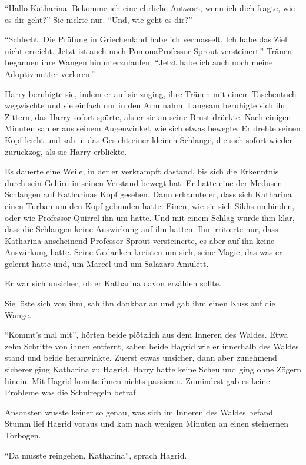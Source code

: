 \enquote{Hallo Katharina. Bekomme ich eine ehrliche Antwort, wenn ich dich fragte, wie es dir geht?} Sie nickte nur. \enquote{Und, wie geht es dir?}

\enquote{Schlecht. Die Prüfung in Griechenland habe ich vermasselt. Ich habe das Ziel nicht erreicht. Jetzt ist auch noch Pomona\abs Professor Sprout versteinert.} Tränen begannen ihre Wangen hinunterzulaufen. \enquote{Jetzt habe ich auch noch meine Adoptivmutter verloren.}

Harry beruhigte sie, indem er auf sie zuging, ihre Tränen mit einem Taschentuch wegwischte und sie einfach nur in den Arm nahm. Langsam beruhigte sich ihr Zittern, das Harry sofort spürte, als er sie an seine Brust drückte. Nach einigen Minuten sah er aus seinem Augenwinkel, wie sich etwas bewegte. Er drehte seinen Kopf leicht und sah in das Gesicht einer kleinen Schlange, die sich sofort wieder zurückzog, als sie Harry erblickte.

Es dauerte eine Weile, in der er verkrampft dastand, bis sich die Erkenntnis durch sein Gehirn in seinen Verstand bewegt hat. Er hatte eine der Medusen-Schlangen auf Katharinas Kopf gesehen. Dann erkannte er, dass sich Katharina einen Turban um den Kopf gebunden hatte. Einen, wie sie sich Sikhs umbinden, oder wie Professor Quirrel ihn um hatte. Und mit einem Schlag wurde ihm klar, dass die Schlangen keine Auswirkung auf ihn hatten. Ihn irritierte nur, dass Katharina anscheinend Professor Sprout versteinerte, es aber auf ihn keine Auswirkung hatte. Seine Gedanken kreisten um sich, seine Magie, das was er gelernt hatte und, um Marcel \gst und um Salazars Amulett.

Er war sich unsicher, ob er Katharina davon erzählen sollte.

Sie löste sich von ihm, sah ihn dankbar an und gab ihm einen Kuss auf die Wange.

\enquote{Kommt’s mal mit}, hörten beide plötzlich aus dem Inneren des Waldes. Etwa zehn Schritte von ihnen entfernt, sahen beide Hagrid wie er innerhalb des Waldes stand und beide heranwinkte. Zuerst etwas unsicher, dann aber zunehmend sicherer ging Katharina zu Hagrid. Harry hatte keine Scheu und ging ohne Zögern hinein. Mit Hagrid konnte ihnen nichts passieren. Zumindest gab es keine Probleme was die Schulregeln betraf.

Ansonsten wusste keiner so genau, was sich im Inneren des Waldes befand. Stumm lief Hagrid voraus und kam nach wenigen Minuten an einen steinernen Torbogen.

\enquote{Da musste reingehen, Katharina}, sprach Hagrid.

